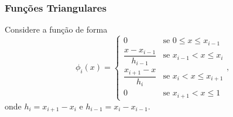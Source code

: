 \documentclass{beamer}
\begin{document}
	\begin{frame}
		\frametitle{Funções Triangulares}
		\justify
		
		Considere a função de forma
		$$
			\phi_i (x) = 
				\begin{cases}
					0 							& \mbox{se } 0 \leqslant x \leqslant x_{i - 1}\\[5pt]
					\dfrac{x-x_{i-1}}{h_{i-1}} 	& \mbox{se } x_{i-1} < x \leqslant x_i\\[10pt]
					\dfrac{x_{i+1}-x}{h_i}		& \mbox{se } x_i < x \leqslant x_{i+1}\\[5pt]
					0							& \mbox{se } x_{i+1}<x\leqslant 1
				\end{cases}
			\text{,}
		$$
		onde $h_i = x_{i+1}-x_{i}$ e $h_{i-1}=x_i-x_{i-1}$.
	\end{frame}
	
\end{document}
